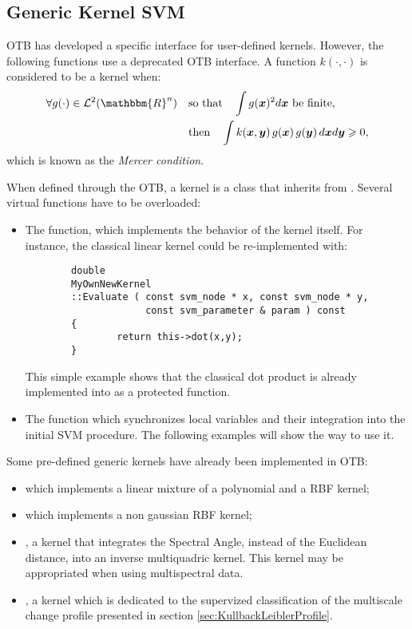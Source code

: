 \ifitkFullVersion

\fi




\subsection{Generic Kernel SVM}
OTB has developed a specific interface for user-defined kernels. However, the 
following functions use a deprecated OTB interface. A function 
$k(\cdot,\cdot)$ is considered to be a kernel when:
\begin{align}\label{eqMercer}
        \forall g(\cdot) \in {\cal L}^2(\mathbbm{R}^n) \quad & \text{so 
that} \quad
        \int g(\boldsymbol{x})^2 d\boldsymbol{x} \text{ be finite,} \\
        & \text{then} \quad \int k(\boldsymbol{x},\boldsymbol{y}) \, 
g(\boldsymbol{x})
        \, g(\boldsymbol{y}) \, d\boldsymbol{x} d\boldsymbol{y} \geqslant 0,
        \notag
\end{align}
which is known as the {\em Mercer condition\/}.

When defined through the OTB, a kernel is a class that inherits from
. Several virtual functions have to 
be overloaded:
\begin{itemize}
\item The  function, which implements the behavior of the 
kernel
itself. For instance, the classical linear kernel could be re-implemented
with:
\begin{verbatim}
        double
        MyOwnNewKernel
        ::Evaluate ( const svm_node * x, const svm_node * y,
                     const svm_parameter & param ) const
        {
                return this->dot(x,y);
        }
\end{verbatim}
This simple example shows that the classical dot product is already 
implemented
into  as a protected
function.
\item The  function which synchronizes local variables and 
their
integration into the initial SVM procedure. The following examples will show
the way to use it.
\end{itemize}

Some pre-defined generic kernels have already been implemented in OTB:
\begin{itemize}
\item {} which implements a 
linear mixture
of a polynomial and a RBF kernel;
\item {} which implements a non
gaussian RBF kernel;
\item {}, a kernel that integrates
the Spectral Angle, instead of the Euclidean distance, into an inverse 
multiquadric kernel.
This kernel may be appropriated when using multispectral data.
\item {}, a kernel which is
dedicated to the supervized classification of the multiscale change profile
presented in section \ref{sec:KullbackLeiblerProfile}.
\end{itemize}

